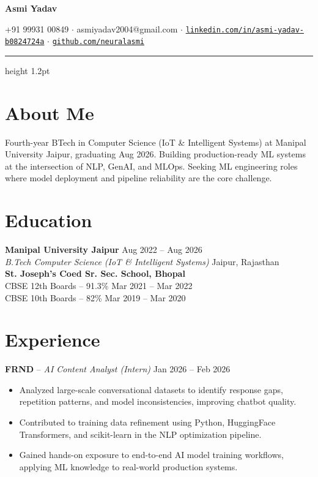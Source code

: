 \documentclass[11pt,a4paper]{article}
\newcommand{\github}[1]{\href{https://github.com/#1}{\texttt{github.com/#1}}}
\newcommand{\linkedin}[1]{\href{https://linkedin.com/in/#1}{\texttt{linkedin.com/in/#1}}}
\begin{document}
{\fontsize{22}{26}\selectfont\textbf{Asmi Yadav}}\par
\vspace{4pt}
{\fontsize{10}{13}\selectfont
\textcolor{light}{+91 99931 00849  $\cdot$  asmiyadav2004@gmail.com  $\cdot$
\linkedin{asmi-yadav-b0824724a}  $\cdot$  \github{neuralasmi}}
}\par
\vspace{6pt}
{\color{accent}\hrule height 1.2pt}\par
\vspace{6pt}

\section*{About Me}
Fourth-year BTech in Computer Science (IoT \& Intelligent Systems) at Manipal
University Jaipur, graduating Aug 2026. Building production-ready ML systems at
the intersection of NLP, GenAI, and MLOps. Seeking ML engineering roles where
model deployment and pipeline reliability are the core challenge.

\section*{Education}
\textbf{Manipal University Jaipur} \hfill Aug 2022 -- Aug 2026 \\
\textit{B.Tech Computer Science (IoT \& Intelligent Systems)} \hfill Jaipur, Rajasthan \\[6pt]
\textbf{St. Joseph's Coed Sr. Sec. School, Bhopal} \\
CBSE 12th Boards -- 91.3\% \hfill Mar 2021 -- Mar 2022 \\
CBSE 10th Boards -- 82\% \hfill Mar 2019 -- Mar 2020

\section*{Experience}

\textbf{FRND} -- \textit{AI Content Analyst (Intern)} \hfill Jan 2026 -- Feb 2026
\begin{itemize}
  \item Analyzed large-scale conversational datasets to identify response gaps,
        repetition patterns, and model inconsistencies, improving chatbot quality.
  \item Contributed to training data refinement using Python, HuggingFace
        Transformers, and scikit-learn in the NLP optimization pipeline.
  \item Gained hands-on exposure to end-to-end AI model training workflows,
        applying ML knowledge to real-world production systems.
\end{itemize}
\end{document}
